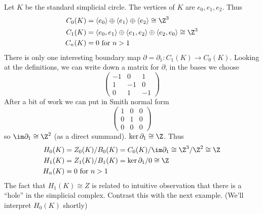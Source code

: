 \documentclass[a4paper]{article}
\renewcommand{\b}{\partial} %
\begin{document}
\begin{eg}
  Let \(K\) be the standard simplicial circle. The vertices of \(K\) are \(e_0, e_1, e_2\). Thus
  \begin{align*}
    C_0(K) &= \langle e_0 \rangle \oplus \langle e_1 \rangle \oplus \langle e_2 \rangle \cong \Z^3 \\
    C_1(K) &= \langle e_0, e_1 \rangle \oplus \langle e_1, e_2 \rangle \oplus \langle e_2, e_0 \rangle \cong \Z^3 \\
    C_n(K) &= 0 \text{ for } n > 1
  \end{align*}
  There is only one interesting boundary map \(\b = \b_1: C_1(K) \to C_0(K)\). Looking at the definitions, we can write down a matrix for \(\b\), in the bases we choose
  \[
    \begin{pmatrix}
      -1 & 0 & 1 \\
      1 & -1 & 0 \\
      0 & 1 & -1
    \end{pmatrix}
  \]
  After a bit of work we can put in Smith normal form
  \[
    \begin{pmatrix}
      1 & 0 & 0 \\
      0 & 1 & 0 \\
      0 & 0 & 0
    \end{pmatrix}
  \]
  so \(\im \b_1 \cong \Z^2\) (as a direct summand). \(\ker \b_1 \cong \Z\). Thus
  \begin{align*}
    H_0(K) &= Z_0(K)/B_0(K) = C_0(K)/\im \b_1 \cong \Z^3 / \Z^2 \cong \Z \\
    H_1(K) &= Z_1(K)/B_1(K) = \ker \b_1/0 \cong \Z \\
    H_n(K) &= 0 \text{ for } n > 1
  \end{align*}
  The fact that \(H_1(K) \cong Z\) is related to intuitive observation that there is a ``hole'' in the simplicial complex. Contrast this with the next example. (We'll interpret \(H_0(K)\) shortly)
\end{eg}
\end{document}
